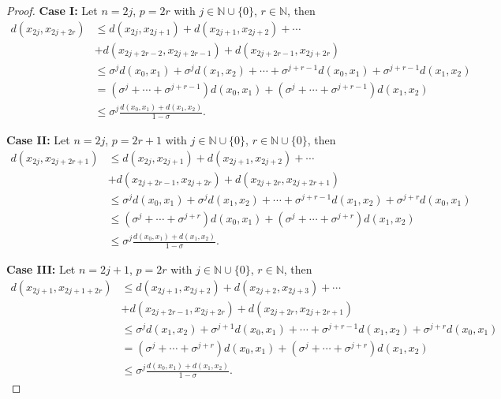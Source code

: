 \documentclass[10pt,a4paper]{amsart}
\begin{document}
\begin{proof}
\smallskip
\textbf{Case I:} Let $n=2j$, $p=2r$ with $j \in \mathbb{N} \cup \{0\}$, $r \in \mathbb{N}$, then
\begin{align}\label{e26}
d(x_{2j},x_{2j+2r})
&\le d(x_{2j},x_{2j+1})+d(x_{2j+1},x_{2j+2})+\cdots\nonumber\\
&+d(x_{2j+2r-2},x_{2j+2r-1})+d(x_{2j+2r-1},x_{2j+2r})\nonumber\\
&\le \sigma^j d(x_0,x_1)+\sigma^j d(x_1,x_2)+\cdots+\sigma^{j+r-1} d(x_0,x_1)+\sigma^{j+r-1} d(x_1,x_2)\nonumber\\
&=(\sigma^j+\cdots+\sigma^{j+r-1})d(x_0,x_1)+(\sigma^j+\cdots+\sigma^{j+r-1}) d(x_1,x_2)\nonumber\\
&\le \sigma^j \frac{d(x_0,x_1)+d(x_1,x_2)}{1-\sigma}.
\end{align}

\textbf{Case II:} Let $n=2j$, $p=2r+1$ with $j \in \mathbb{N} \cup \{0\}$, $r \in \mathbb{N} \cup \{0\}$, then
\begin{align}\label{e27}
d(x_{2j},x_{2j+2r+1})
&\le d(x_{2j},x_{2j+1})+d(x_{2j+1},x_{2j+2})+\cdots\nonumber\\
&+d(x_{2j+2r-1},x_{2j+2r})+d(x_{2j+2r},x_{2j+2r+1})\nonumber\\
&\le \sigma^j d(x_0,x_1)+\sigma^j d(x_1,x_2)+\cdots+\sigma^{j+r-1} d(x_1,x_2)+\sigma^{j+r} d(x_0,x_1)\nonumber\\
&\le (\sigma^j+\cdots+\sigma^{j+r})d(x_0,x_1)+(\sigma^j+\cdots+\sigma^{j+r})d(x_1,x_2)\nonumber\\
&\le \sigma^j \frac{d(x_0,x_1)+d(x_1,x_2)}{1-\sigma}.
\end{align}

\textbf{Case III:} Let $n=2j+1$, $p=2r$ with $j \in \mathbb{N} \cup \{0\}$, $r \in \mathbb{N}$, then
\begin{align}\label{e28}
d(x_{2j+1},x_{2j+1+2r})
&\le d(x_{2j+1},x_{2j+2})+d(x_{2j+2},x_{2j+3})+\cdots\nonumber\\
&+d(x_{2j+2r-1},x_{2j+2r})+d(x_{2j+2r},x_{2j+2r+1})\nonumber\\
&\le \sigma^j d(x_1,x_2)+\sigma^{j+1} d(x_0,x_1)+\cdots+\sigma^{j+r-1} d(x_1,x_2)+\sigma^{j+r} d(x_0,x_1)\nonumber\\
&=(\sigma^j+\cdots+\sigma^{j+r})d(x_0,x_1)+(\sigma^j+\cdots+\sigma^{j+r})d(x_1,x_2)\nonumber\\
&\le \sigma^j \frac{d(x_0,x_1)+d(x_1,x_2)}{1-\sigma}.
\end{align}


\end{proof}
\end{document}
